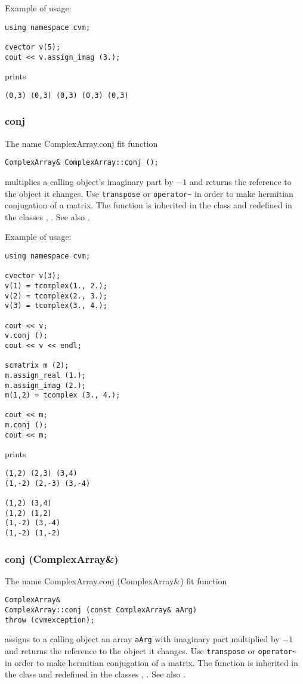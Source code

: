 Example of usage:
\begin{verbatim}
using namespace cvm;

cvector v(5);
cout << v.assign_imag (3.);
\end{verbatim}
prints
\begin{verbatim}
(0,3) (0,3) (0,3) (0,3) (0,3)
\end{verbatim}
\newpage


\subsubsection{conj}
The%
\pdfdest name {ComplexArray.conj} fit{ }
function
\begin{verbatim}
ComplexArray& ComplexArray::conj ();
\end{verbatim}
multiplies a calling object's imaginary part by $-1$
and returns the reference to
the object it changes. Use \verb"transpose" or \verb"operator~"
in order to
make hermitian conjugation of a matrix.
The function is inherited in the class
and redefined in the classes
,
.
See also .

Example of usage:
\begin{verbatim}
using namespace cvm;

cvector v(3);
v(1) = tcomplex(1., 2.);
v(2) = tcomplex(2., 3.);
v(3) = tcomplex(3., 4.);

cout << v;
v.conj ();
cout << v << endl;

scmatrix m (2);
m.assign_real (1.);
m.assign_imag (2.);
m(1,2) = tcomplex (3., 4.);

cout << m;
m.conj ();
cout << m;
\end{verbatim}
prints
\begin{verbatim}
(1,2) (2,3) (3,4)
(1,-2) (2,-3) (3,-4)

(1,2) (3,4)
(1,2) (1,2)
(1,-2) (3,-4)
(1,-2) (1,-2)
\end{verbatim}
\newpage




\subsubsection{conj (ComplexArray\&)}
The%
\pdfdest name {ComplexArray.conj (ComplexArray&)} fit{ }
function
\begin{verbatim}
ComplexArray&
ComplexArray::conj (const ComplexArray& aArg)
throw (cvmexception);
\end{verbatim}
assigns to a calling object
an array \verb"aArg"
with imaginary part multiplied by $-1$
and returns the reference to
the object it changes. Use \verb"transpose" or \verb"operator~"
in order to
make hermitian conjugation of a matrix.
The function is inherited in the class
and redefined in the classes
,
.
See also .

